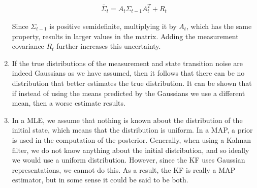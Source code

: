 \documentclass[a4paper,12pt]{article}
\begin{document}
\begin{enumerate}
  \begin{align*}
    \bar{\Sigma}_t=A_t\Sigma_{t-1}A^T_t+R_t
  \end{align*}

  Since $\Sigma_{t-1}$ is positive semidefinite, multiplying it by $A_t$, which
  has the same property, results in larger values in the matrix. Adding the
  measurement covariance $R_t$ further increases this uncertainty.
\item If the true distributions of the measurement and state transition noise
  are indeed Gaussians as we have assumed, then it follows that there can be no
  distribution that better estimates the true distribution. It can be shown that
  if instead of using the means predicted by the Gaussians we use a different
  mean, then a worse estimate results.
\item In a MLE, we assume that nothing is known about the distribution of the
  initial state, which means that the distribution is uniform. In a MAP, a prior
  is used in the computation of the posterior. Generally, when using a Kalman
  filter, we do not know anything about the initial distribution, and so ideally
  we would use a uniform distribution. However, since the KF uses Gaussian
  representations, we cannot do this. As a result, the KF is really a MAP
  estimator, but in some sense it could be said to be both.
\end{enumerate}
\end{document}
